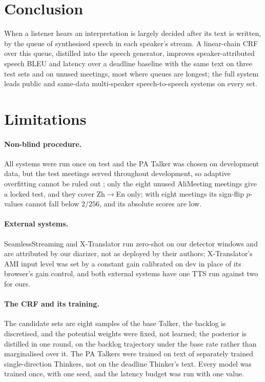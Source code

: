 \section{Conclusion}
\label{sec:conclusion}

When a listener hears an interpretation is largely decided after its text is written, by the queue of synthesised
speech in each speaker's stream. A linear-chain CRF over this queue, distilled into the speech generator, improves
speaker-attributed speech BLEU and latency over a deadline baseline with the same text on three test sets and on unused
meetings, most where queues are longest; the full system leads public and same-data multi-speaker speech-to-speech
systems on every set.

\section*{Limitations}

\paragraph{Non-blind procedure.}\label{sec:res-hygiene} All systems were run once on test and the PA Talker was chosen
on development data, but the test meetings served throughout development, so adaptive overfitting cannot be ruled out%
\ifAliEval{}; only the eight unused AliMeeting meetings give a locked test, and they cover Zh$\rightarrow$En only;
with eight meetings its sign-flip $p$-values cannot fall below $2/256$, and its absolute scores are low\fi.

\paragraph{External systems.} SeamlessStreaming and X-Translator run zero-shot on our detector windows and are
attributed by our diarizer, not as deployed by their authors; X-Translator's AMI input level was set by a constant gain
calibrated on dev in place of its browser's gain control, and both external systems have one TTS run against two for
ours.

\paragraph{The CRF and its training.} The candidate sets are eight samples of the base Talker, the backlog is
discretised, and the potential weights were fixed, not learned; the posterior is distilled in one round, on the backlog
trajectory under the base rate rather than marginalised over it. The PA Talkers were trained on text of separately
trained single-direction Thinkers, not on the deadline Thinker's text. Every model was trained once, with one
seed, and the latency budget was run with one value.

